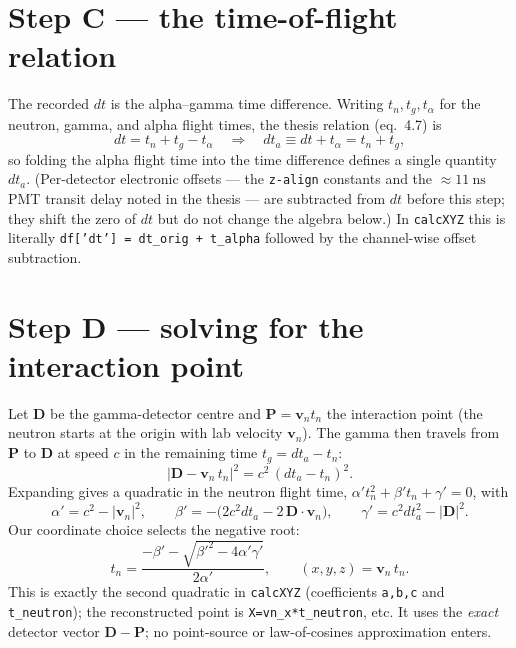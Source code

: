 \documentclass[11pt]{article}
\newcommand{\code}[1]{\texttt{\small #1}}
\newcommand{\dta}{\mathit{dt}_a}
\newcommand{\dt}{\mathit{dt}}
\begin{document}
\section{Step C --- the time-of-flight relation}
The recorded $\dt$ is the alpha--gamma time difference. Writing $t_n,t_g,t_\alpha$
for the neutron, gamma, and alpha flight times, the thesis relation (eq.~4.7) is
\begin{equation}
  \dt=t_n+t_g-t_\alpha
  \quad\Longrightarrow\quad
  \dta\equiv \dt+t_\alpha=t_n+t_g,
\end{equation}
so folding the alpha flight time into the time difference defines a single
quantity $\dta$. (Per-detector electronic offsets --- the \code{z-align}
constants and the ${\approx}\SI{11}{\ns}$ PMT transit delay noted in the thesis
--- are subtracted from $\dt$ before this step; they shift the zero of $\dt$ but
do not change the algebra below.) In \code{calcXYZ} this is literally
\code{df['dt'] = dt\_orig + t\_alpha} followed by the channel-wise offset
subtraction.

\section{Step D --- solving for the interaction point}
Let $\bm D$ be the gamma-detector centre and $\bm P=\bm v_n t_n$ the interaction
point (the neutron starts at the origin with lab velocity $\bm v_n$). The gamma
then travels from $\bm P$ to $\bm D$ at speed $c$ in the remaining time
$t_g=\dta-t_n$:
\begin{equation}
  |\bm D-\bm v_n\,t_n|^2=c^2\,(\dta-t_n)^2 .
\end{equation}
Expanding gives a quadratic in the neutron flight time,
$\alpha' t_n^2+\beta' t_n+\gamma'=0$, with
\begin{equation}
  \alpha'=c^2-|\bm v_n|^2,\qquad
  \beta'=-\bigl(2c^2\dta-2\,\bm D\cdot\bm v_n\bigr),\qquad
  \gamma'=c^2\dta^2-|\bm D|^2 .
\end{equation}
Our coordinate choice selects the negative root:
\begin{equation}
  t_n=\frac{-\beta'-\sqrt{\beta'^2-4\alpha'\gamma'}}{2\alpha'},
  \qquad (x,y,z)=\bm v_n\,t_n .
\end{equation}
This is exactly the second quadratic in \code{calcXYZ} (coefficients
\code{a,b,c} and \code{t\_neutron}); the reconstructed point is
\code{X=vn\_x*t\_neutron}, etc. It uses the \emph{exact} detector vector
$\bm D-\bm P$; no point-source or law-of-cosines approximation enters.
\end{document}
